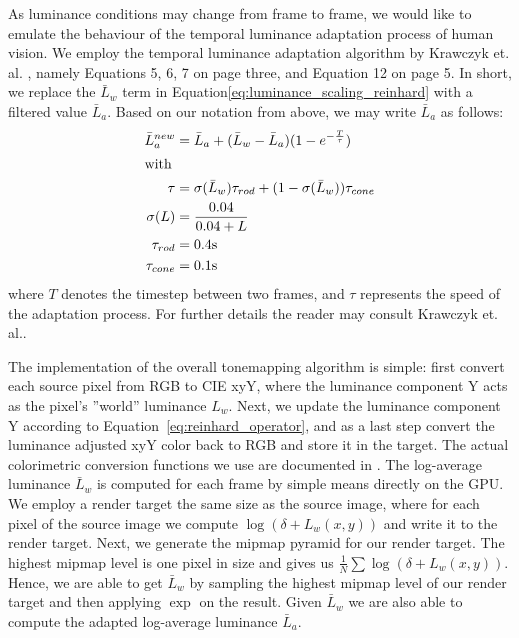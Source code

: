 As luminance conditions may change from frame to frame, we would like to emulate
the behaviour of the temporal luminance adaptation process of human vision. We
employ the temporal luminance adaptation algorithm by Krawczyk et. al.
\cite{Krawczyk:2005}, namely Equations 5, 6, 7 on page three, and Equation 12 on
page 5. In short, we replace the $\bar L_w$ term in Equation\ref{eq:luminance_scaling_reinhard}
with a filtered value $\bar L_a$. Based on our notation from above, we may write
$\bar L_a$ as follows:
\begin{subequations}
\begin{align}
 \bar L_a^{new} &= \bar L_a + (\bar L_w - \bar L_a) (1-e^{-\frac{T}{\tau}}) \\
\intertext{with}
 \tau &= \sigma(\bar L_w)\tau_{rod} + (1-\sigma(\bar L_w))\tau_{cone} \\
 \sigma(L) &= \frac{0.04}{0.04 + L}\\
 \tau_{rod} &= 0.4\text{s} \\
 \tau_{cone} &= 0.1\text{s}
\end{align}
\end{subequations}
where $T$ denotes the timestep between two frames, and $\tau$ represents the
speed of the adaptation process. For further details the reader may consult
Krawczyk et. al.\cite{Krawczyk:2005}.

The implementation of the overall tonemapping algorithm is simple: first convert
each source pixel from RGB to CIE xyY, where the luminance component Y acts as
the pixel's ''world'' luminance $L_w$. Next, we update the luminance component Y
according to Equation~\ref{eq:reinhard_operator}, and as a last step convert the
luminance adjusted xyY color back to RGB and store it in the target. The actual
colorimetric conversion functions we use are documented in \cite{misc:colorconversion}.
The log-average luminance $\bar L_w$ is computed for each frame by simple means
directly on the GPU. We employ a render target the same size as the source image,
where for each pixel of the source image we compute $\log(\delta + L_w(x,y))$ and
write it to the render target. Next, we generate the mipmap pyramid for our render
 target. The highest mipmap level is one pixel in size and gives us
$\frac{1}{N}\sum\log(\delta + L_w(x,y))$. Hence, we are able to get $\bar L_w$ by sampling
the highest mipmap level of our render target and then applying $\exp$ on the result.
Given $\bar L_w$ we are also able to compute the adapted log-average luminance $\bar L_a$.